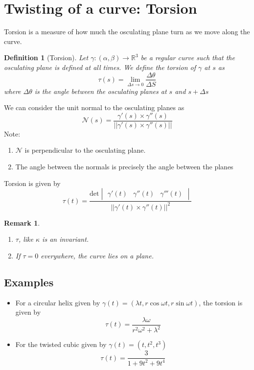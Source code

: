 \documentclass[oneside]{book}\twocolumn
\newtheorem{definition}[theorem]{Definition}
\newtheorem*{remark}{Remark}
\begin{document}
\section{Twisting of a curve: Torsion}
Torsion is a measure of how much the osculating plane turn as we move along the curve. 
\begin{definition}[Torsion]
	Let $\gamma:(\alpha,\beta)\to\mathbb R^3$ be a regular curve such that the osculating plane is defined at all times. We define the torsion of $\gamma$ at $s$ as
	$$\tau(s)=\lim_{\Delta s\to0}\frac{\Delta \theta}{\Delta S}$$
	where $\Delta \theta$ is the angle between the osculating planes at $s$ and $s+\Delta s$
\end{definition}
We can consider the unit normal to the osculating planes as
$$\mathcal{N}(s)=\frac{\gamma'(s)\times\gamma''(s)}{||\gamma'(s)\times\gamma''(s)||}$$
Note:
\begin{enumerate}
	\item  $\mathcal{N}$ is perpendicular to the osculating plane.
	\item The angle between the normals is precisely the angle between the planes
\end{enumerate}
Torsion is given by
$$\tau(t)=\frac{\text{det}\begin{vmatrix}\gamma'(t)&\gamma''(t)&\gamma'''(t)\end{vmatrix}}{||\gamma'(t)\times\gamma''(t)||^2}$$
\begin{remark}
	\begin{enumerate}
		\item $\tau$, like $\kappa$ is an invariant. 
		\item If $\tau=0$ everywhere, the curve lies on a plane.
	\end{enumerate}
\end{remark}
\subsection{Examples}
\begin{itemize}
	\item For a circular helix given by $\gamma(t)=(\lambda t,r\cos\omega t,r\sin\omega t)$, the torsion is given by 
	$$\tau(t)=\frac{\lambda\omega}{r^2\omega^2+\lambda^2}$$
	\item For the twisted cubic given by $\gamma(t)=(t,t^2,t^3)$
	$$\tau(t)=\frac{3}{1+9t^2+9t^4}$$
\end{itemize}
\end{document}
